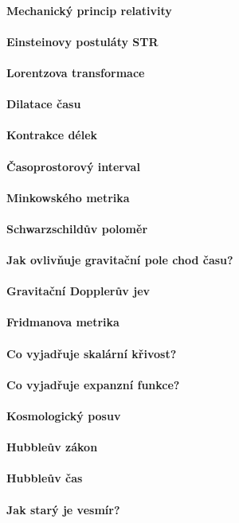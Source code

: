 \documentclass[11pt,a4paper,notitlepage,twocolumn]{article}
\begin{document}
\paragraph{Mechanický princip relativity}
\paragraph{Einsteinovy postuláty STR}
\paragraph{Lorentzova transformace}
\paragraph{Dilatace času}
\paragraph{Kontrakce délek}
\paragraph{Časoprostorový interval}
\paragraph{Minkowského metrika}
\paragraph{Schwarzschildův poloměr}
\paragraph{Jak ovlivňuje gravitační pole chod času?}
\paragraph{Gravitační Dopplerův jev}
\paragraph{Fridmanova metrika}
\paragraph{Co vyjadřuje skalární křivost?}
\paragraph{Co vyjadřuje expanzní funkce?}
\paragraph{Kosmologický posuv}
\paragraph{Hubbleův zákon}
\paragraph{Hubbleův čas}
\paragraph{Jak starý je vesmír?}
\end{document}
